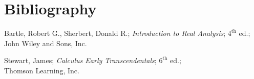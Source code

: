 \section{Bibliography}

\begin{thebibliography}{9}
Bartle, Robert G., Sherbert, Donald R.; \textit{Introduction to Real Analysis}; $4^{\text{th}}$ ed.;\\ John Wiley and Sons, Inc.

Stewart, James; \textit{Calculus Early Transcendentals}; $6^{\text{th}}$ ed.;\\ Thomson Learning, Inc.

\end{thebibliography}